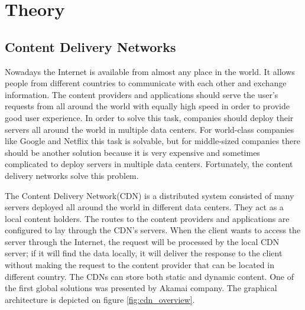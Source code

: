 \section{Theory}
	
\subsection{Content Delivery Networks}


Nowadays the Internet is available from almost any place in the world. It allows people from different countries to communicate with each other and exchange information. The content providers and applications should serve the user's requests from all around the world with equally high speed in order to provide good user experience. In order to solve this task, companies should deploy their servers all around the world in multiple data centers. For world-class companies like Google and Netflix this task is solvable\cite{NetflixCDN}, but for middle-sized companies there should be another solution because it is very expensive and sometimes complicated to deploy servers in multiple data centers. Fortunately, the content delivery networks solve this problem\cite{AkamaiCDN}.

The Content Delivery Network(CDN) is a distributed system consisted of many servers deployed all around the world in different data centers. They act as a local content holders. The routes to the content providers and applications are configured to lay through the CDN's servers. When the client wants to access the server through the Internet, the request will be processed by the local CDN server; if it will find the data locally, it will deliver the response to the client without making the request to the content provider that can be located in different country. The CDNs can store both static and dynamic content. One of the first global solutions was presented by Akamai company\cite{AkamaiCDN}. The graphical architecture is depicted on figure \ref{fig:cdn_overview}.

